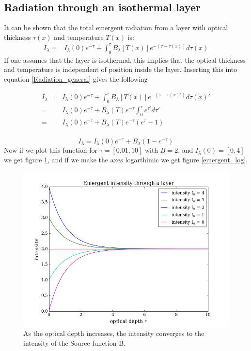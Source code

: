 \documentclass{aa}   %
\begin{document}
\subsection{Radiation through an isothermal layer}
It can be shown that the total emergent radiation from a layer with optical thickness $\tau(x)$ and temperature $T(x)$ is:
\begin{equation}\label{Radiation_general}
\begin{aligned}
 I_{\lambda} =& I_{\lambda}(0)e^{-\tau} + \int_0^\tau B_{\lambda}[T(x)]e^{-(\tau - \tau(x))}d\tau(x)
\end{aligned}
\end{equation}
If one assumes that the layer is isothermal, this implies that the optical thickness and temperature is independent of position inside the layer. Inserting this into equation \ref{Radiation_general} gives the following

\begin{equation*}
\begin{aligned}
I_{\lambda} =& I_{\lambda}(0)e^{-\tau} + \int_0^\tau B_{\lambda}[T(x)]e^{-(\tau - \tau(x)')}d\tau(x)'\\
	    =& I_{\lambda}(0)e^{-\tau} + B_{\lambda}(T)e^{-\tau}\int_0^\tau e^{\tau'}d\tau'\\
	    =& I_{\lambda}(0)e^{-\tau} + B_{\lambda}(T)e^{-\tau}(e^{\tau} - 1)\\
\end{aligned}
\end{equation*}

\begin{equation}\label{Radiation_isothermal}
 I_{\lambda} = I_{\lambda}(0)e^{-\tau} + B_{\lambda}(1 - e^{-\tau})
\end{equation}
Now if we plot this function for $\tau = [0.01,10]$ with $B = 2$, and $I_{\lambda}(0) = [0,4]$ we get figure \ref{emergent_original}, and if we make the axes logarthimic we get figure \ref{emergent_log}.

\begin{figure}
\includegraphics[width=.49\textwidth]{emergent_original.png}
\caption{As the optical depth increases, the intensity converges to the intensity of the Source function B.}
\label{emergent_original}
\end{figure}
\end{document}
